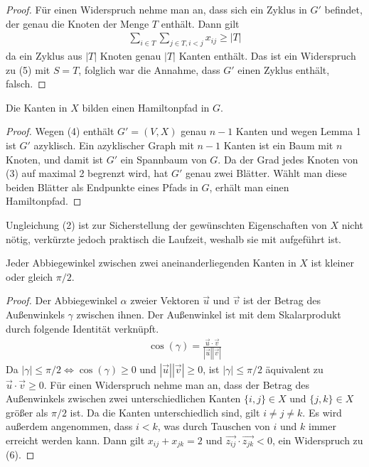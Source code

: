 \documentclass[a4paper, 10pt, ngerman]{article}
\begin{document}
\begin{proof}
    Für einen Widerspruch nehme man an, dass sich ein Zyklus in $G'$ befindet, der genau die Knoten der Menge $T$ enthält. Dann gilt
    \begin{align*}
        \sum_{i \in T} \sum_{j \in T, i < j} x_{ij} \ge |T|
    \end{align*}
    da ein Zyklus aus $|T|$ Knoten genau $|T|$ Kanten enthält. Das ist ein Widerspruch zu (5) mit $S = T$, folglich war die Annahme, dass $G'$ einen Zyklus enthält, falsch.
\end{proof}

\begin{lemma}
    Die Kanten in $X$ bilden einen Hamiltonpfad in $G$.
\end{lemma}

\begin{proof}
    Wegen (4) enthält $G' = (V, X)$ genau $n - 1$ Kanten und wegen Lemma 1 ist $G'$ azyklisch. Ein azyklischer Graph mit $n - 1$ Kanten ist ein Baum mit $n$ Knoten, und damit ist $G'$ ein Spannbaum von $G$. Da der Grad jedes Knoten von (3) auf maximal 2 begrenzt wird, hat $G'$ genau zwei Blätter. Wählt man diese beiden Blätter als Endpunkte eines Pfads in $G$, erhält man einen Hamiltonpfad.
\end{proof}
 
Ungleichung (2) ist zur Sicherstellung der gewünschten Eigenschaften von $X$ nicht nötig, verkürzte jedoch praktisch die Laufzeit, weshalb sie mit aufgeführt ist.

\begin{lemma}
    Jeder Abbiegewinkel zwischen zwei aneinanderliegenden Kanten in $X$ ist kleiner oder gleich $\pi / 2$.
\end{lemma}

\begin{proof}
    Der Abbiegewinkel $\alpha$ zweier Vektoren $\vec{u}$ und $\vec{v}$ ist der Betrag des Außenwinkels $\gamma$ zwischen ihnen. Der Außenwinkel ist mit dem Skalarprodukt durch folgende Identität verknüpft.
    \begin{align*}
        \cos(\gamma) = \frac {\vec{u} \cdot \vec{v}} {|\vec{u}||\vec{v}|}
    \end{align*}
    Da $|\gamma| \le \pi / 2 \Longleftrightarrow \cos(\gamma) \ge 0$ und $|\vec{u}| |\vec{v}| \ge 0$, ist $|\gamma| \le \pi / 2$ äquivalent zu $\vec{u} \cdot \vec{v} \ge 0$. Für einen Widerspruch nehme man an, dass der Betrag des Außenwinkels zwischen zwei unterschiedlichen Kanten $\{i, j\} \in X$ und $\{j, k\} \in X$ größer als $\pi / 2$ ist. Da die Kanten unterschiedlich sind, gilt $i \ne j \ne k$. Es wird außerdem angenommen, dass $i < k$, was durch Tauschen von $i$ und $k$ immer erreicht werden kann. Dann gilt $x_{ij} + x_{jk} = 2$ und $\vec{z_{ij}} \cdot \vec{z_{jk}} < 0$, ein Widerspruch zu (6). 
\end{proof}
\end{document}
